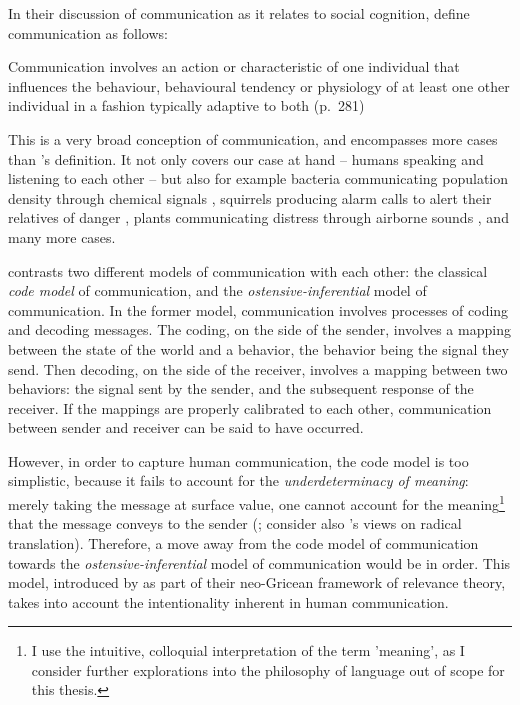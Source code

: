 In their discussion of communication as it relates to social cognition, \citet{Freeberg19} define communication as follows:
\begin{quoting}
    Communication involves an action or characteristic of one individual that influences the behaviour, behavioural tendency or physiology of at least one other individual in a fashion typically adaptive to both
    \hfill (p.~281)
\end{quoting}
This is a very broad conception of communication, and encompasses more cases than \citeauthor{DawkinsKrebs78}'s definition. It not only covers our case at hand -- humans speaking and listening to each other -- but also for example bacteria communicating population density through chemical signals \citep{Federle03}, squirrels producing alarm calls to alert their relatives of danger \citep{Sherman77}, plants communicating distress through airborne sounds \citep{Khait23}, and many more cases.

\citet{Scott-Phillips15-primate} contrasts two different models of communication with each other: the classical \emph{code model} of communication, and the \emph{ostensive-inferential} model of communication.
In the former model, communication involves processes of coding and decoding messages. The coding, on the side of the sender, involves a mapping between the state of the world and a behavior, the behavior being the signal they send. Then decoding, on the side of the receiver, involves a mapping between two behaviors: the signal sent by the sender, and the subsequent response of the receiver. If the mappings are properly calibrated to each other, communication between sender and receiver can be said to have occurred.

However, in order to capture human communication, the code model is too simplistic, because it fails to account for the \emph{underdeterminacy of meaning}: merely taking the message at surface value, one cannot account for the meaning\footnote{I use the intuitive, colloquial interpretation of the term 'meaning', as I consider further explorations into the philosophy of language out of scope for this thesis.} that the message conveys to the sender (\citet{Scott-Phillips18-communication}; consider also \citet{Quine60}'s views on radical translation).
Therefore, a move away from the code model of communication towards the \emph{ostensive-inferential} model of communication would be in order. This model, introduced by \citet{SperberWilson86} as part of their neo-Gricean framework of relevance theory, takes into account the intentionality inherent in human communication.

